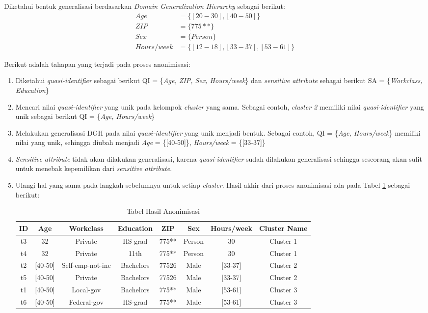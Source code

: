 \noindent Diketahui bentuk generalisasi berdasarkan \textit{Domain Generalization Hierarchy} sebagai berikut:
\begin{align*}
Age &= \{[20-30], [40-50]\}\\
ZIP &= \{775**\}\\
Sex &= \{Person\}\\
Hours/week &=\{[12-18], [33-37], [53-61]\}
\end{align*} 

\noindent Berikut adalah tahapan yang terjadi pada proses anonimisasi:
\begin{enumerate}

\item Diketahui \textit{quasi-identifier} sebagai berikut QI = \{\textit{Age, ZIP, Sex, Hours/week}\} dan \textit{sensitive attribute} sebagai berikut SA = \{\textit{Workclass, Education}\}

\item Mencari nilai \textit{quasi-identifier} yang unik pada kelompok \textit{cluster} yang sama. Sebagai contoh, \textit{cluster 2} memiliki nilai \textit{quasi-identifier} yang unik sebagai berikut QI = \{\textit{Age, Hours/week}\}

\item Melakukan generalisasi DGH pada nilai \textit{quasi-identifier} yang unik menjadi bentuk. Sebagai contoh, QI = \{\textit{Age, Hours/week}\} memiliki nilai yang unik, sehingga diubah menjadi \textit{Age} = \{[40-50]\}, \textit{Hours/week} = \{[33-37]\}

\item \textit{Sensitive attribute} tidak akan dilakukan generalisasi, karena \textit{quasi-identifier} sudah dilakukan generalisasi sehingga seseorang akan sulit untuk menebak kepemilikan dari \textit{sensitive attribute}.

\item Ulangi hal yang sama pada langkah sebelumnya untuk setiap \textit{cluster}. Hasil akhir dari proses anonimisasi ada pada Tabel \ref{table:anonimisasi} sebagai berikut: 
\begin{table}[H]
\centering
\caption{Tabel Hasil Anonimisasi}
\begin{tabular}{c c c c c c c c}
\hline 
ID & Age & Workclass & Education & ZIP & Sex & Hours/week & Cluster Name\\ 
\hline 
t3 & 32 & Private & HS-grad & 775** & Person & 30 & Cluster 1 \\ 
t4 & 32 & Private & 11th & 775** & Person & 30 & Cluster 1 \\ 
\hline 
t2 & [40-50] & Self-emp-not-inc & Bachelors & 77526 & Male & [33-37] & Cluster 2 \\ 
t5 & [40-50] & Private & Bachelors & 77526 & Male & [33-37]	& Cluster 2\\ 
\hline 
t1 & [40-50] & Local-gov & Bachelors & 775** & Male & [53-61] & Cluster 3\\ 
t6 & [40-50] & Federal-gov & HS-grad & 775** & Male & [53-61] & Cluster 3\\ 
\hline 
\end{tabular} 
\label{table:anonimisasi}
\end{table}

\end{enumerate}

